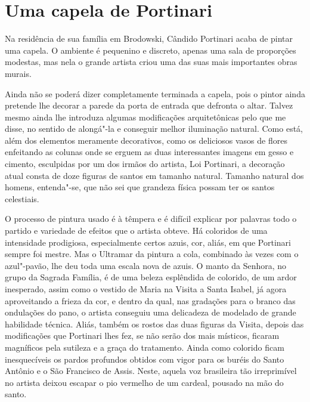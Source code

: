 \chapter{Uma capela de Portinari}

Na residência de sua família em Brodowski, Cândido Portinari acaba de
pintar uma capela. O ambiente é pequenino e discreto, apenas uma sala de
proporções modestas, mas nela o grande artista criou uma das suas mais
importantes obras murais.

Ainda não se poderá dizer completamente terminada a capela, pois o
pintor ainda pretende lhe decorar a parede da porta de entrada que
defronta o altar. Talvez mesmo ainda lhe introduza algumas modificações
arquitetônicas pelo que me disse, no sentido de alongá"-la e conseguir
melhor iluminação natural. Como está, além dos elementos meramente
decorativos, como os deliciosos vasos de flores enfeitando as colunas
onde se erguem as duas interessantes imagens em gesso e cimento,
esculpidas por um dos irmãos do artista, Loi Portinari, a decoração
atual consta de doze figuras de santos em tamanho natural. Tamanho
natural dos homens, entenda"-se, que não sei que grandeza física possam
ter os santos celestiais.

O processo de pintura usado é à têmpera e é difícil explicar por
palavras todo o partido e variedade de efeitos que o artista obteve. Há
coloridos de uma intensidade prodigiosa, especialmente certos azuis,
cor, aliás, em que Portinari sempre foi mestre. Mas o Ultramar da
pintura a cola, combinado às vezes com o azul"-pavão, lhe deu toda uma
escala nova de azuis. O manto da Senhora, no grupo da Sagrada Família, é
de uma beleza esplêndida de colorido, de um ardor inesperado, assim como
o vestido de Maria na Visita a Santa Isabel, já agora aproveitando a
frieza da cor, e dentro da qual, nas gradações para o branco das
ondulações do pano, o artista conseguiu uma delicadeza de modelado de
grande habilidade técnica. Aliás, também os rostos das duas figuras da
Visita, depois das modificações que Portinari lhes fez, se não serão dos
mais místicos, ficaram magníficos pela sutileza e a graça do tratamento.
Ainda como colorido ficam inesquecíveis os pardos profundos obtidos com
vigor para os buréis do Santo Antônio e o São Francisco de Assis. Neste,
aquela voz brasileira tão irreprimível no artista deixou escapar o pio
vermelho de um cardeal, pousado na mão do santo.

